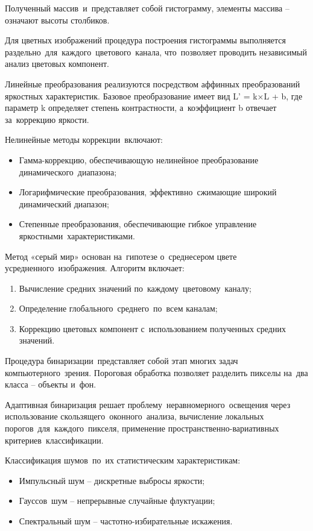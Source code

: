 \documentclass{ou}
\begin{document}
Полученный массив~и~представляет собой гистограмму, элементы массива -- означают высоты столбиков.

Для цветных изображений процедура построения гистограммы выполняется раздельно~для~каждого~цветового~канала, что~позволяет проводить независимый анализ цветовых компонент.

Линейные преобразования реализуются посредством аффинных преобразований яркостных характеристик. Базовое преобразование имеет вид L' = k×L + b, где параметр k определяет степень контрастности, а~коэффициент b отвечает за~коррекцию яркости.

Нелинейные методы коррекции~включают:
\begin{itemize}[label=-, itemindent=2em, nosep]
\item Гамма-коррекцию, обеспечивающую нелинейное преобразование динамического~диапазона;
\item Логарифмические преобразования, эффективно~сжимающие широкий динамический диапазон;
\item Степенные преобразования, обеспечивающие гибкое управление яркостными~характеристиками.
\end{itemize}

Метод «серый мир» основан на~гипотезе о~среднесером цвете усредненного~изображения. Алгоритм включает:
\begin{enumerate}[itemindent=2em, nosep, label=\arabic*)]
\item Вычисление средних значений по~каждому~цветовому~каналу;
\item Определение глобального~среднего~по~всем каналам;
\item Коррекцию цветовых компонент с~использованием полученных средних значений.
\end{enumerate}

Процедура бинаризации~представляет собой этап многих задач компьютерного~зрения. Пороговая обработка позволяет разделить пикселы на~два класса -- объекты и~фон.

Адаптивная бинаризация решает проблему~неравномерного~освещения через использование скользящего~оконного~анализа, вычисление локальных порогов~для~каждого~пикселя, применение пространственно-вариативных критериев~классификации.

Классификация шумов~по~их статистическим характеристикам:
\begin{itemize}[label=-, itemindent=2em, nosep]
\item Импульсный шум -- дискретные выбросы яркости;
\item Гауссов~шум -- непрерывные случайные флуктуации;
\item Спектральный шум -- частотно-избирательные искажения.
\end{itemize}
\end{document}
